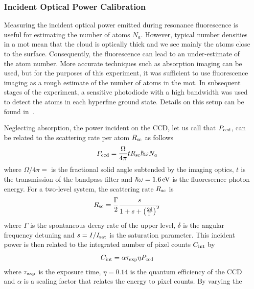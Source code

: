 \subsubsection{Incident Optical Power Calibration} 
Measuring the incident optical power emitted
during resonance fluorescence is useful for estimating the
number of atoms \(N_a\). However, typical number densities in a
\ac{mot} mean that the cloud is optically thick and we see mainly 
the atoms close to the surface. Consequently, the fluorescence can
lead to an under-estimate of the atom number. More accurate techniques such as
absorption imaging can be used, but for the purposes of this
experiment, it was
sufficient to use fluorescence imaging as a rough estimate of the
number of atoms in the \ac{mot}. In subsequent stages of the
experiment, a sensitive photodiode with a high bandwidth was used to
detect the atoms in each hyperfine ground state. Details on this setup
can
be found in~. \par\noindent
Neglecting absorption, the power incident on the CCD, let us call that
\(P_\textnormal{ccd}\), can be related to the scattering rate per atom
$R_\textnormal{sc}$ as follows
\begin{equation}
	P_\textnormal{ccd} = \frac{\Omega}{4\pi} t R_\textnormal{sc}  \hbar \omega N_a
\end{equation}
where $\Omega/4\pi = $ is the fractional solid angle subtended by
the imaging optics, \(t\) is the transmission of the bandpass filter
and 
\(\hbar \omega =
\sivalue{1.6}{\electronvolt}\) is the fluorescence photon energy. For a
two-level system, the scattering rate $R_\textnormal{sc}$ is 
\begin{equation}
  \label{eq:scattering_rate}
  R_\textnormal{sc} = \frac{\Gamma}{2} \frac{s}{1+s+\left(\frac{2
  \delta}{\Gamma}\right)^2}
\end{equation}
where $\Gamma$ is the spontaneous decay rate of the upper level, $\delta$ is
the angular frequency detuning and $s = I/I_\textnormal{sat}$ is the
saturation parameter. This incident power
is then related to the integrated number of pixel counts \(C_\textnormal{int}\)
by
\begin{equation}
	C_\textnormal{int} = \alpha \tau_\textnormal{exp} \eta P_\textnormal{ccd}
\end{equation}
where \(\tau_\textnormal{exp}\) is the exposure time, \(\eta = 0.14\) is the
quantum efficiency of the CCD and \(\alpha\) is a scaling factor that relates
the energy to pixel counts. By varying the
